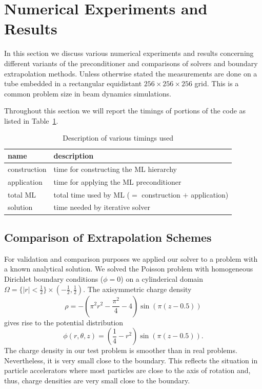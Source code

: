 \section{Numerical Experiments and Results}
\label{sec:results}

In this section we discuss various numerical experiments and results
concerning different variants of the preconditioner and comparisons of
solvers and boundary extrapolation methods.  Unless otherwise stated the
measurements are done on a tube embedded in a rectangular equidistant
$256\times256\times256$ grid.  This is a common problem size in beam
dynamics simulations.

Throughout this section we will report the timings of portions of the
code as listed in Table~\ref{tbl:timings_description}.
\begin{table}[ht]
  \begin{center}
    \begin{tabular}{ll}
      \hline
      name & description \\
      \hline
      construction & time for constructing the ML hierarchy \\
      application  & time for applying the ML preconditioner \\
      total ML     & total time used by ML ($=$ construction $+$ application) \\
      solution     & time needed by iterative solver \\
      \hline
    \end{tabular}
    \caption{Description of various timings used}
    \label{tbl:timings_description}
  \end{center}
\end{table}

\subsection{Comparison of Extrapolation Schemes}

For validation and comparison purposes we applied our solver to a
problem with a known analytical solution.  We solved the Poisson problem
with homogeneous Dirichlet boundary conditions ($\phi = 0$) on a
cylinderical domain $\Omega = \{ |r|<\frac{1}{2} \} \times
(-\frac{1}{2},\frac{1}{2})$.  The axisymmetric charge density
\begin{equation*}
  \rho = -\left( \pi^2 r^2 - \frac{\pi^2}{4} - 4 \right)
  \sin(\pi(z-0.5))
\end{equation*}
gives rise to the potential distribution
%
\begin{equation*}
  \phi(r, \theta, z) = \left( \frac{1}{4}-r^2 \right) \sin(\pi(z-0.5)).
\end{equation*}
The charge density in our test problem is smoother than in real
problems.  Nevertheless, it is very small close to the boundary.  This
reflects the situation in particle accelerators where most particles are
close to the axis of rotation and, thus, charge densities are very small
close to the boundary. 

